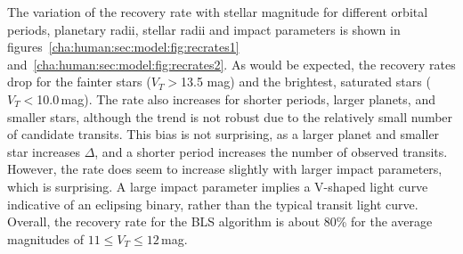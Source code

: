 The variation of the recovery rate with stellar magnitude for different orbital periods, planetary radii, stellar radii and impact parameters is shown in figures~\ref{cha:human:sec:model:fig:recrates1} and~\ref{cha:human:sec:model:fig:recrates2}.
As would be expected, the recovery rates drop for the fainter stars ($V_{T}>$13.5 mag) and the brightest, saturated stars ($V_{T}<$10.0\,mag).
The rate also increases for shorter periods, larger planets, and smaller stars, although the trend is not robust due to the relatively small number of candidate transits.
This bias is not surprising, as a larger planet and smaller star increases $\Delta$, and a shorter period increases the number of observed transits. However, the rate does seem to increase slightly with larger impact parameters, which is surprising. A large impact parameter implies a V-shaped light curve indicative of an eclipsing binary, rather than the typical transit light curve.
Overall, the recovery rate for the BLS algorithm is about 80\% for the average magnitudes of $11 \leq V_{T} \leq 12$\,mag.


